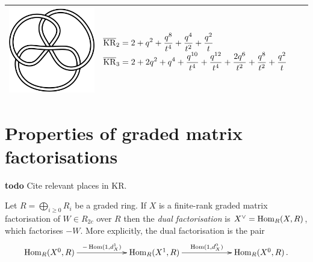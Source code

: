 \documentclass{compositio}
\theoremstyle{definition}
\numberwithin{equation}{section}
\def\Hom{\operatorname{Hom}}
\begin{document}
{\begin{longtable}{p{}|p{}}
\includegraphics[scale=0.07,angle=0]{link6_3_3.pdf} 
& 
$
\displaystyle{%
\overline{\KR}_{2} = 2+q^2+\frac{q^8}{t^4}+\frac{q^4}{t^2}+\frac{q^2}{t}
}
$
\newline 
$
\displaystyle{%
\overline{\KR}_{3} = 2+2 q^2+q^4+\frac{q^{10}}{t^4}+\frac{q^{12}}{t^4}+\frac{2 q^6}{t^2}+\frac{q^8}{t^2}+\frac{q^2}{t}
}
$
\\
\hline
\end{longtable}
}


\newpage
\appendix

\section{Properties of graded matrix factorisations}\label{appendix:graded_mfs}

\textbf{todo} Cite relevant places in KR.

Let $R = \bigoplus_{i \ge 0} R_i$ be a graded ring. If $X$ is a finite-rank graded matrix factorisation of $W \in R_{2c}$ over $R$ then the \emph{dual factorisation} is $X\mdual = \Hom_R(X,R)$, which factorises $-W$. More explicitly, the dual factorisation is the pair
\[
\xymatrix@C+3pc{
\Hom_R(X^0, R) \ar[r]^-{-\Hom(1, d^1_X)} & \Hom_R(X^1,R) \ar[r]^-{\Hom(1,d^0_X)} & \Hom_R(X^0, R) \, .
}
\]
\end{document}
